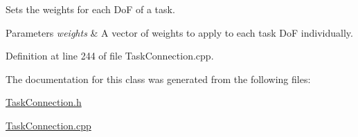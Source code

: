 Sets the weights for each DoF of a task. 
\begin{DoxyParams}{Parameters}
{\em weights} & A vector of weights to apply to each task DoF individually. \\
\hline
\end{DoxyParams}


Definition at line 244 of file Task\+Connection.\+cpp.



The documentation for this class was generated from the following files\+:\begin{DoxyCompactItemize}
\item 
\hyperlink{TaskConnection_8h}{Task\+Connection.\+h}\item 
\hyperlink{TaskConnection_8cpp}{Task\+Connection.\+cpp}\end{DoxyCompactItemize}
